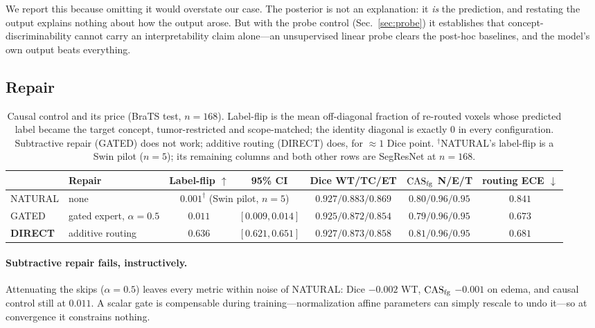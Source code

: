 We report this because omitting it would overstate our case. The posterior is not an explanation:
it \emph{is} the prediction, and restating the output explains nothing about how the output arose.
But with the probe control (Sec.~\ref{sec:probe}) it establishes that concept-discriminability
cannot carry an interpretability claim alone---an unsupervised linear probe clears the post-hoc
baselines, and the model's own output beats everything.

\subsection{Repair}
\label{sec:repair}

\begin{table}[t]\centering\small
\caption{Causal control and its price (BraTS test, $n{=}168$). Label-flip is the mean off-diagonal
fraction of re-routed voxels whose predicted label became the target concept, tumor-restricted and
scope-matched; the identity diagonal is exactly $0$ in every configuration. Subtractive repair
(GATED) does not work; additive routing (DIRECT) does, for ${\approx}1$ Dice point.
$^\dagger$NATURAL's label-flip is a Swin pilot ($n{=}5$); its remaining columns and both other rows are
SegResNet at $n{=}168$.}
\label{tab:repair}
\begin{tabular}{llccccc}
\toprule
& Repair & Label-flip $\uparrow$ & 95\% CI & Dice WT/TC/ET & $\mathrm{CAS}_{\mathrm{fg}}$ N/E/T & routing ECE $\downarrow$ \\
\midrule
NATURAL & none & \multicolumn{2}{c}{$0.001^\dagger$ \; \footnotesize(Swin pilot, $n{=}5$)} & $0.927/0.883/0.869$ & $0.80/0.96/0.95$ & $0.841$ \\
GATED & gated expert, $\alpha{=}0.5$ & $0.011$ & $[0.009,0.014]$ & $0.925/0.872/0.854$ & $0.79/0.96/0.95$ & $0.673$ \\
\textbf{DIRECT} & additive routing & $\mathbf{0.636}$ & $[0.621,0.651]$ & $0.927/0.873/0.858$ & $\mathbf{0.81}/0.96/0.95$ & $\mathbf{0.681}$ \\
\bottomrule
\end{tabular}
\end{table}

\paragraph{Subtractive repair fails, instructively.}
Attenuating the skips ($\alpha{=}0.5$) leaves every metric within noise of NATURAL: Dice $-0.002$ WT,
$\mathrm{CAS}_{\mathrm{fg}}$ $-0.001$ on edema, and causal control still at $0.011$. A scalar gate is compensable
during training---normalization affine parameters can simply rescale to undo it---so at
convergence it constrains nothing.

